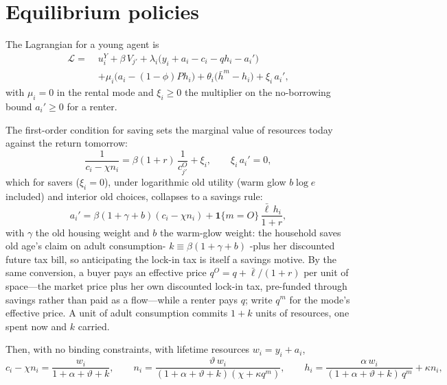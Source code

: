 \documentclass[11pt]{article}
\begin{document}
\section{Equilibrium policies}

The Lagrangian for a young agent is
\[
\begin{aligned}
\mathcal L=\;&u_i^Y+\beta\,V_{j'}+\lambda_i\big(y_i+a_i-c_i-qh_i-a_i'\big)\\
&+\mu_i\big(a_i-(1-\phi)Ph_i\big)+\theta_i\big(\bar h^m-h_i\big)+\xi_i\,a_i',
\end{aligned}
\]
with $\mu_i=0$ in the rental mode and $\xi_i\ge0$ the multiplier on the no-borrowing bound $a_i'\ge0$ for a renter. 

The first-order condition for saving sets the marginal value of resources today against the return tomorrow:
\[
\frac{1}{c_i-\chi n_i}=\beta(1+r)\,\frac{1}{c_{j'}^O}+\xi_i,
\qquad
\xi_i\,a_i'=0,
\]
which for savers ($\xi_i=0$), under logarithmic old utility (warm glow $b\log e$ included) and interior old choices, collapses to a savings rule:
\[
a_i'=\beta\left(1+\gamma+b\right)(c_i-\chi n_i)+\mathbf 1\{m=O\}\,\frac{\bar\ell\,h_i}{1+r},
\]
with $\gamma$ the old housing weight and $b$ the warm-glow weight: the household saves old age's claim on adult consumption- $k\equiv\beta(1+\gamma+b)$ -plus her discounted future tax bill, so anticipating the lock-in tax is itself a savings motive. By the same conversion, a buyer pays an effective price $q^O=q+\bar\ell/(1+r)$ per unit of space---the market price plus her own discounted lock-in tax, pre-funded through savings rather than paid as a flow---while a renter pays $q$; write $q^m$ for the mode's effective price. A unit of adult consumption commits $1+k$ units of resources, one spent now and $k$ carried.

Then, with no binding constraints, with lifetime resources $w_i=y_i+a_i$,
\[
c_i-\chi n_i=\frac{w_i}{1+\alpha+\vartheta+k},
\qquad
n_i=\frac{\vartheta\,w_i}{(1+\alpha+\vartheta+k)(\chi+\kappa q^m)},
\qquad
h_i=\frac{\alpha\,w_i}{(1+\alpha+\vartheta+k)\,q^m}+\kappa n_i,
\]
\end{document}

